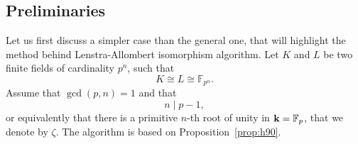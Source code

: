 %

\subsection{Preliminaries}
\label{sec:preliminaries}

Let us first discuss a simpler case than the general one, that will highlight
the method behind Lenstra-Allombert isomorphism algorithm. Let $K$ and $L$ be
two finite fields of cardinality $p^n$, such that
\[
  K\cong L\cong \mathbb{F}_{p^n}.
\]
Assume that $\gcd(p, n)=1$ and that
\[
  n\mid p-1,
\]
or equivalently that there is a primitive $n$-th root of unity in
$\mathbf{k}=\mathbb{F}_p$, that we denote by $\zeta$. The algorithm is based on
Proposition~\ref{prop:h90}.

